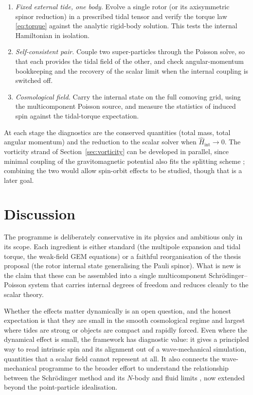 \documentclass[11pt,a4paper]{article}
\begin{document}
\begin{enumerate}
  \item \emph{Fixed external tide, one body.} Evolve a single rotor (or its
  axisymmetric spinor reduction) in a prescribed tidal tensor and verify the torque law
  \eqref{eq:torque} against the analytic rigid-body solution. This tests the internal
  Hamiltonian in isolation.
  \item \emph{Self-consistent pair.} Couple two super-particles through the Poisson
  solve, so that each provides the tidal field of the other, and check angular-momentum
  bookkeeping and the recovery of the scalar limit when the internal coupling is
  switched off.
  \item \emph{Cosmological field.} Carry the internal state on the full comoving grid,
  using the multicomponent Poisson source, and measure the statistics of induced spin
  against the tidal-torque expectation.
\end{enumerate}

At each stage the diagnostics are the conserved quantities (total mass, total angular
momentum) and the reduction to the scalar solver when $\hat{H}_{\mathrm{int}}\to 0$. The
vorticity strand of Section~\ref{sec:vorticity} can be developed in parallel, since
minimal coupling of the gravitomagnetic potential also fits the splitting scheme
\citep{watanabe2000}; combining the two would allow spin-orbit effects to be studied,
though that is a later goal.

\section{Discussion}
\label{sec:discussion}

The programme is deliberately conservative in its physics and ambitious only in its
scope. Each ingredient is either standard (the multipole expansion and tidal torque,
the weak-field GEM equations) or a faithful reorganisation of the thesis proposal (the
rotor internal state generalising the Pauli spinor). What is new is the claim that these
can be assembled into a single multicomponent Schr\"odinger--Poisson system that carries
internal degrees of freedom and reduces cleanly to the scalar theory.

Whether the effects matter dynamically is an open question, and the honest expectation
is that they are small in the smooth cosmological regime and largest where tides are
strong or objects are compact and rapidly forced. Even where the dynamical effect is
small, the framework has diagnostic value: it gives a principled way to read intrinsic
spin and its alignment out of a wave-mechanical simulation, quantities that a scalar
field cannot represent at all. It also connects the wave-mechanical programme to the
broader effort to understand the relationship between the Schr\"odinger method and its
$N$-body and fluid limits \citep{widrow_kaiser1993,uhlemann2014}, now extended beyond
the point-particle idealisation.
\end{document}
